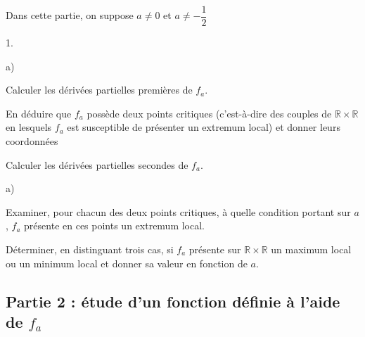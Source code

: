 \documentclass[11pt]{article}%
\begin{document}
Dans cette partie, on suppose $a\neq 0$ et $a\neq -\dfrac{1}{2}$

\begin{noliste}{1.}
 \setlength{\itemsep}{4mm}
\item 
\begin{noliste}{a)}
 \setlength{\itemsep}{2mm}
\item Calculer les dérivées partielles premières de $f_{a}.$

\item En déduire que $f_{a}$ possède deux points critiques
(c'est-à-dire des couples de $\mathbb{R\times R}$ en lesquels $f_{a}$
est
susceptible de présenter un extremum local) et donner leurs coordonnées
\end{noliste}

\item Calculer les dérivées partielles secondes de $f_{a}.
$

\item 
\begin{noliste}{a)}
 \setlength{\itemsep}{2mm}
\item Examiner, pour chacun des deux points critiques, à quelle
condition portant sur $a$, $f_{a}$ présente en ces points un extremum
local.

\item Déterminer, en distinguant trois cas, si $f_{a}$ présente sur
$\mathbb{R\times R}$ un maximum local ou un minimum local et donner sa
valeur
en fonction de $a.$
\end{noliste}
\end{noliste}

\subsection*{Partie 2 : étude d'un fonction définie à l'aide de
$f_{a}$}
\end{document}

